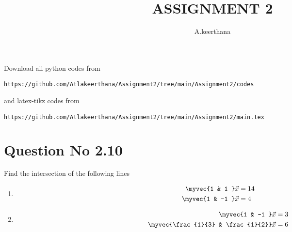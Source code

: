 \documentclass[journal,12pt,twocolumn]{IEEEtran}
\begin{document}
     \def\rightbox#1{\makebox[0in][r]{#1}}
     \def\centbox#1{\makebox[0in]{#1}}
     \def\topbox#1{\raisebox{-\baselineskip}[0in][0in]{#1}}
     \def\midbox#1{\raisebox{-0.5\baselineskip}[0in][0in]{#1}}
\vspace{3cm}
\title{ASSIGNMENT 2}
\author{A.keerthana}
\maketitle
\newpage
\bigskip
\renewcommand{\thefigure}{\theenumi}
\renewcommand{\thetable}{\theenumi}
Download all python codes from 
\begin{lstlisting}
https://github.com/Atlakeerthana/Assignment2/tree/main/Assignment2/codes
\end{lstlisting}
%
and latex-tikz codes from 
%
\begin{lstlisting}
https://github.com/Atlakeerthana/Assignment2/tree/main/Assignment2/main.tex
\end{lstlisting}
%
\section{Question No 2.10}
Find the intersection of the following lines
%
\begin{enumerate}
\item
\begin{align}
\begin{split}
\myvec{1 & 1 }\vec{x}&=14
\\
\myvec{1 & -1 }\vec{x}&=4 \label{1.0.1}
\end{split}
\end{align}
\item
\begin{align}
\begin{split}
\myvec{1 & -1 }\vec{x}&=3
\\
\myvec{\frac{1}{3} & \frac{1}{2}}\vec{x}&=6 \label{1.0.2}
\end{split}
\end{align}
\end{enumerate}
%
\end{document}
